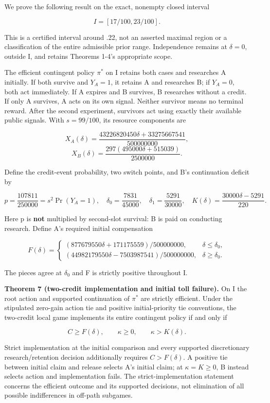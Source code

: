 \documentclass[
  11pt,
]{article}
\begin{document}
We prove the following result on the exact, nonempty closed interval

\[I=[17/100,23/100]. \tag{13}\]

This is a certified interval around .22, not an asserted maximal region
or a classification of the entire admissible prior range. Independence
remains at \(\delta=0\), outside I, and retains Theorems 1-4's
appropriate scope.

The efficient contingent policy \(\pi^*\) on I retains both cases and
researches A initially. If both survive and \(Y_A=1\), it retains A and
researches B; if \(Y_A=0\), both act immediately. If A expires and B
survives, B researches without a credit. If only A survives, A acts on
its own signal. Neither survivor means no terminal reward. After the
second experiment, survivors act using exactly their available public
signals. With \(s=99/100\), its resource components are

\[X_A(\delta)=\frac{43226820450\delta+33275667541}{500000000},\]
\[X_B(\delta)=\frac{297(495000\delta+515039)}{2500000}. \tag{14}\]

Define the credit-event probability, two switch points, and B's
continuation deficit by

\[p=\frac{107811}{250000}=s^2\Pr(Y_A=1),\quad
\delta_0=\frac{7831}{45000},\quad
\delta_1=\frac{5291}{30000},\quad
K(\delta)=\frac{30000\delta-5291}{220}. \tag{15}\]

Here p is \textbf{not} multiplied by second-slot survival: B is paid on
conducting research. Define A's required initial compensation

\[F(\delta)=\begin{cases}
(877679550\delta+171175559)/500000000,&\delta\leq\delta_0,\\
(44982179550\delta-7503987541)/500000000,&\delta\geq\delta_0.
\end{cases} \tag{16}\]

The pieces agree at \(\delta_0\) and F is strictly positive throughout
I.

\textbf{Theorem 7 (two-credit implementation and initial toll failure).}
On I the root action and supported continuation of \(\pi^*\) are
strictly efficient. Under the stipulated zero-gain action tie and
positive initial-priority tie conventions, the two-credit local game
implements its entire contingent policy if and only if

\[C\geq F(\delta),\qquad \kappa\geq0,\qquad
\kappa>K(\delta). \tag{17}\]

Strict implementation at the initial comparison and every supported
discretionary research/retention decision additionally requires
\(C>F(\delta)\). A positive tie between initial claim and release
selects A's initial claim; at \(\kappa=K\geq0\), B instead selects
action and implementation fails. The strict-implementation statement
concerns the efficient outcome and its supported decisions, not
elimination of all possible indifferences in off-path subgames.
\end{document}
